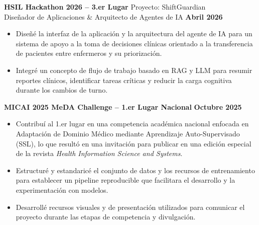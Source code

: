 \documentclass[11pt]{article}
\begin{document}
\textbf{HSIL Hackathon 2026 -- 3.er Lugar} \hfill Proyecto: ShiftGuardian\\
Diseñador de Aplicaciones \& Arquitecto de Agentes de IA \hfill \textbf{Abril 2026}
\vspace{-0.3cm}
\begin{itemize}[leftmargin=*]
    \item Diseñé la interfaz de la aplicación y la arquitectura del agente de IA para un sistema de apoyo a la toma de decisiones clínicas orientado a la transferencia de pacientes entre enfermeros y su priorización.
    
    \vspace{-0.3cm}
    \item Integré un concepto de flujo de trabajo basado en RAG y LLM para resumir reportes clínicos, identificar tareas críticas y reducir la carga cognitiva durante los cambios de turno.
\end{itemize}



\textbf{MICAI 2025 MeDA Challenge -- 1.er Lugar Nacional} \hfill \textbf{Octubre 2025}
\vspace{-0.3cm}
\begin{itemize}[leftmargin=*]
    \item Contribuí al 1.er lugar en una competencia académica nacional enfocada en Adaptación de Dominio Médico mediante Aprendizaje Auto-Supervisado (SSL), lo que resultó en una invitación para publicar en una edición especial de la revista \textit{Health Information Science and Systems}.
    
    \vspace{-0.3cm}
    \item Estructuré y estandaricé el conjunto de datos y los recursos de entrenamiento para establecer un pipeline reproducible que facilitara el desarrollo y la experimentación con modelos.
    
    \vspace{-0.3cm}
    \item Desarrollé recursos visuales y de presentación utilizados para comunicar el proyecto durante las etapas de competencia y divulgación.
\end{itemize}
\end{document}
